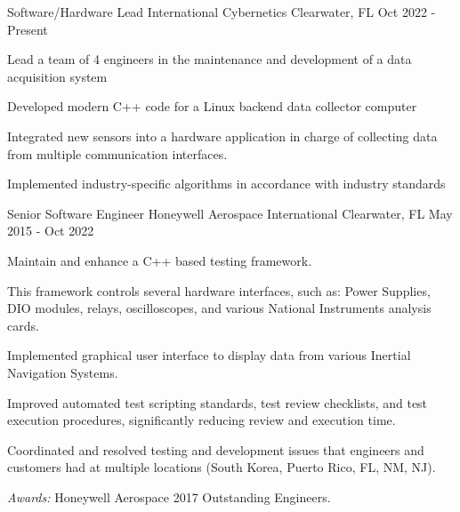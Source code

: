 

\begin{cventries}

  \cventry
    {Software/Hardware Lead} %
    {International Cybernetics} %
    {Clearwater, FL} %
    {Oct 2022 - Present} %
    {
      \begin{cvitems} %
        \item {Lead a team of 4 engineers in the maintenance and development of a data acquisition system}
        \item {Developed modern C++ code for a Linux backend data collector computer}
        \item {Integrated new sensors into a hardware application in charge of collecting data from multiple communication interfaces.}
        \item {Implemented industry-specific algorithms in accordance with industry standards}
    \end{cvitems}
    }
  \cventry
    {Senior Software Engineer} %
    {Honeywell Aerospace International} %
    {Clearwater, FL} %
    {May 2015 - Oct 2022} %
    {
      \begin{cvitems} %
        \item {Maintain and enhance a C++ based testing framework.}
				\item {This framework controls several hardware interfaces, such as: Power Supplies, DIO modules, relays, oscilloscopes, and various National Instruments analysis cards.}
        \item {Implemented graphical user interface to display data from various Inertial Navigation Systems.}
				\item {Improved automated test scripting standards, test review checklists, and test execution procedures, significantly reducing review and execution time.}
        \item {Coordinated and resolved testing and development issues that engineers and customers had at multiple locations (South Korea, Puerto Rico, FL, NM, NJ).}
				\item {{\it Awards:} Honeywell Aerospace 2017 Outstanding Engineers.}
      \end{cvitems}
    }


\end{cventries}
